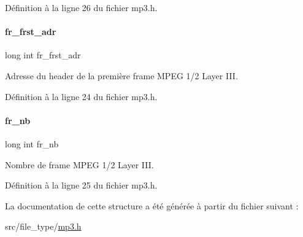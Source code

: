 Définition à la ligne 26 du fichier mp3.\+h.

\mbox{\label{a00170_a2dd557563c90ce058f662d1298f0e3e6}} 
\paragraph{\texorpdfstring{fr\+\_\+frst\+\_\+adr}{fr\_frst\_adr}}
{\footnotesize\ttfamily long int fr\+\_\+frst\+\_\+adr}

Adresse du header de la première frame M\+P\+EG 1/2 Layer I\+II. 

Définition à la ligne 24 du fichier mp3.\+h.

\mbox{\label{a00170_a01ffc583bacb63600e32d207f1cf3475}} 
\paragraph{\texorpdfstring{fr\+\_\+nb}{fr\_nb}}
{\footnotesize\ttfamily long int fr\+\_\+nb}

Nombre de frame M\+P\+EG 1/2 Layer I\+II. 

Définition à la ligne 25 du fichier mp3.\+h.



La documentation de cette structure a été générée à partir du fichier suivant \+:\begin{DoxyCompactItemize}
\item 
src/file\+\_\+type/\hyperlink{a00089}{mp3.\+h}\end{DoxyCompactItemize}
